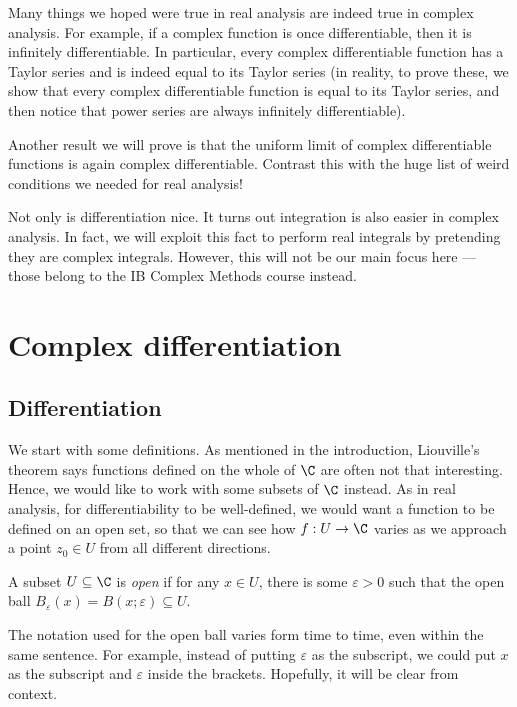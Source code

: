 \documentclass[a4paper]{article}
\begin{document}
Many things we hoped were true in real analysis are indeed true in complex analysis. For example, if a complex function is once differentiable, then it is infinitely differentiable. In particular, every complex differentiable function has a Taylor series and is indeed equal to its Taylor series (in reality, to prove these, we show that every complex differentiable function is equal to its Taylor series, and then notice that power series are always infinitely differentiable).

Another result we will prove is that the uniform limit of complex differentiable functions is again complex differentiable. Contrast this with the huge list of weird conditions we needed for real analysis!

Not only is differentiation nice. It turns out integration is also easier in complex analysis. In fact, we will exploit this fact to perform real integrals by pretending they are complex integrals. However, this will not be our main focus here --- those belong to the IB Complex Methods course instead.


\section{Complex differentiation}
\subsection{Differentiation}
We start with some definitions. As mentioned in the introduction, Liouville's theorem says functions defined on the whole of $\C$ are often not that interesting. Hence, we would like to work with some subsets of $\C$ instead. As in real analysis, for differentiability to be well-defined, we would want a function to be defined on an open set, so that we can see how $f: U \to \C$ varies as we approach a point $z_0 \in U$ from all different directions.

\begin{defi}
  A subset $U \subseteq \C$ is \emph{open} if for any $x \in U$, there is some $\varepsilon > 0$ such that the open ball $B_\varepsilon(x) = B(x; \varepsilon) \subseteq U$.
\end{defi}
The notation used for the open ball varies form time to time, even within the same sentence. For example, instead of putting $\varepsilon$ as the subscript, we could put $x$ as the subscript and $\varepsilon$ inside the brackets. Hopefully, it will be clear from context.
\end{document}
